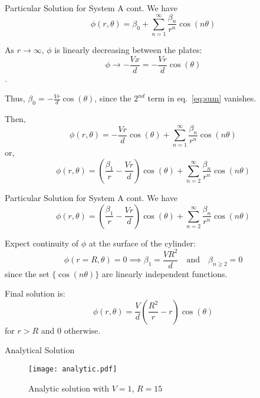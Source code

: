 \documentclass{beamer}
\newcommand{\be}{\begin{equation}}
\newcommand{\ee}{\end{equation}}
\begin{document}
\begin{frame}{Particular Solution for System A cont.}
We have
%
\be
\label{eq:sum}
\phi(r, \theta) = \beta_0 + \sum_{n=1}^{\infty} \frac{\beta_n}{r^n} \cos(n\theta)
\ee

As $r \rightarrow \infty$, $\phi$ is linearly decreasing between the plates:
%
\be
\phi \rightarrow -\frac{Vx}{d}=-\frac{Vr}{d}\cos(\theta)
\ee.

Thus, $\beta_0=-\frac{Vr}{d}\cos(\theta)$, since the $2^{nd}$ term in eq.~\ref{eq:sum} 
vanishes.

Then,
%
\be
\phi(r, \theta) = -\frac{Vr}{d}\cos(\theta) + \sum_{n=1}^{\infty} \frac{\beta_n}{r^n} \cos(n\theta)
\ee
%
or,
%
\be
\phi(r, \theta) = (\frac{\beta_1}{r}-\frac{Vr}{d})\cos(\theta) + \sum_{n=2}^{\infty} \frac{\beta_n}{r^n} \cos(n\theta)
\ee

\end{frame}

\begin{frame}{Particular Solution for System A cont.}
We have
%
\be
\phi(r, \theta) = (\frac{\beta_1}{r}-\frac{Vr}{d})\cos(\theta) + \sum_{n=2}^{\infty} \frac{\beta_n}{r^n} \cos(n\theta)
\ee

Expect continuity of $\phi$ at the surface of the cylinder:
%
\be
\phi(r=R,\theta) = 0 \implies \beta_1=\frac{VR^2}{d} \quad
\text{and} \quad \beta_{n \geq 2} = 0
\ee
%
since the set $\{\cos(n \theta)\}$ are linearly independent functions.

Final solution is:
%
\be
\phi(r, \theta) = \frac{V}{d}(\frac{R^2}{r}-r)\cos(\theta)
\ee
for $r>R$ and $0$ otherwise.

\end{frame}

\begin{frame}{Analytical Solution}

\begin{figure}[h!]
\begin{center}
\texttt{[image: analytic.pdf]}
\caption{Analytic solution with $V=1$, $R=15$}
\end{center}
\end{figure}

\end{frame}
\end{document}
